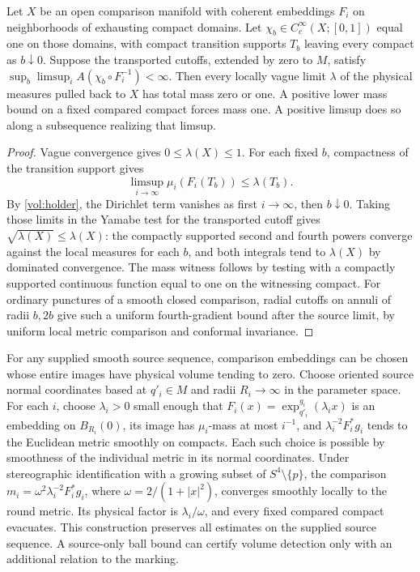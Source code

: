 \begin{proposition}
\label{vol:exhaustion}
Let \(X\) be an open comparison manifold with coherent embeddings
\(F_i\) on neighborhoods of exhausting compact domains. Let
\(\chi_b\in C_c^\infty(X;[0,1])\) equal one on those domains, with
compact transition supports \(T_b\) leaving every compact as
\(b\downarrow0\). Suppose the transported cutoffs, extended by zero to
\(M\), satisfy \(\sup_b\limsup_i A(\chi_b\circ F_i^{-1})<\infty\).
Then every locally vague limit \(\lambda\) of the physical measures
pulled back to \(X\) has total mass zero or one. A positive lower
mass bound on a fixed compared compact forces mass one. A positive
limsup does so along a subsequence realizing that limsup.
\end{proposition}

\begin{proof}
Vague convergence gives \(0\leq\lambda(X)\leq1\). For each fixed
\(b\), compactness of the transition support gives
\[
 \limsup_{i\to\infty}\mu_i(F_i(T_b))\leq\lambda(T_b).
\]
By \eqref{vol:holder}, the Dirichlet term vanishes as first
\(i\to\infty\), then \(b\downarrow0\). Taking those limits in the
Yamabe test for the transported cutoff gives
\(\sqrt{\lambda(X)}\leq\lambda(X)\): the compactly supported second
and fourth powers converge against the local measures for each \(b\),
and both integrals tend to \(\lambda(X)\) by dominated convergence.
The mass witness follows by testing with a compactly supported
continuous function equal to one on the witnessing compact.
For ordinary punctures of a smooth closed comparison, radial cutoffs
on annuli of radii \(b,2b\) give such a uniform fourth-gradient
bound after the source limit, by uniform local metric comparison
and conformal invariance.
\end{proof}

\begin{remark}
\label{vol:normal-chart-evacuation}
For any supplied smooth source sequence, comparison embeddings can
be chosen whose entire images have physical volume tending to zero.
Choose oriented source normal coordinates based at \(q'_i\in M\)
and radii \(R_i\to\infty\) in the parameter space. For each \(i\),
choose \(\lambda_i>0\) small enough that
\(F_i(x)=\exp_{q'_i}^{g_i}(\lambda_i x)\) is an embedding on
\(B_{R_i}(0)\), its image has \(\mu_i\)-mass at most \(i^{-1}\), and
\(\lambda_i^{-2}F_i^*g_i\) tends to the Euclidean metric smoothly on
compacts. Each such choice is possible by smoothness of the individual
metric in its normal coordinates. Under stereographic identification
with a growing subset of \(S^4\setminus\{p\}\), the comparison
\(m_i=\omega^2\lambda_i^{-2}F_i^*g_i\), where
\(\omega=2/(1+|x|^2)\), converges smoothly locally to the round metric.
Its physical factor is \(\lambda_i/\omega\), and every fixed compared
compact evacuates. This construction preserves all estimates on the
supplied source sequence. A source-only ball bound can certify
volume detection only with an additional relation to the marking.
\end{remark}

